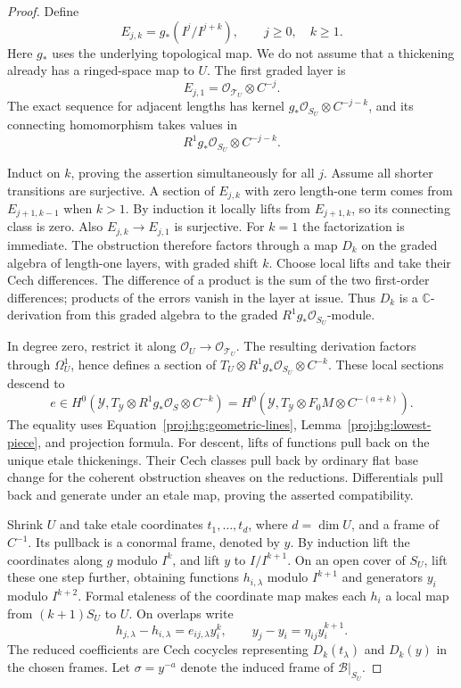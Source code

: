 \documentclass[11pt,letterpaper]{article}
\newcommand{\C}{\mathbb{C}}
\newcommand{\OO}{\mathcal{O}}
\theoremstyle{definition}
\theoremstyle{remark}
\begin{document}
\begin{proof}
Define
\[
 E_{j,k}=g_*(I^j/I^{j+k}),\qquad j\geq0,\quad k\geq1.
\]
Here \(g_*\) uses the underlying topological map.  We do not
assume that a thickening already has a ringed-space map to \(U\).
The first graded layer is
\[
 E_{j,1}=\OO_{\mathcal T_U}\otimes C^{-j}.
\]
The exact sequence for adjacent lengths has kernel
\(g_*\OO_{S_U}\otimes C^{-j-k}\), and its connecting homomorphism
takes values in
\[
 R^1g_*\OO_{S_U}\otimes C^{-j-k}.
\]

Induct on \(k\), proving the assertion simultaneously for all \(j\).
Assume all shorter transitions are surjective.  A section of
\(E_{j,k}\) with zero length-one term comes from \(E_{j+1,k-1}\)
when \(k>1\).  By induction it locally lifts from \(E_{j+1,k}\),
so its connecting class is zero.  Also \(E_{j,k}\to E_{j,1}\)
is surjective.  For \(k=1\) the factorization is immediate.
The obstruction therefore factors through a map \(D_k\) on the
graded algebra of length-one layers, with graded shift \(k\).
Choose local lifts and take their Cech differences.  The
difference of a product is the sum of the two first-order
differences; products of the errors vanish in the layer at issue.
Thus \(D_k\) is a \(\C\)-derivation from this graded algebra to
the graded \(R^1g_*\OO_{S_U}\)-module.

In degree zero, restrict it along
\(\OO_U\to\OO_{\mathcal T_U}\).  The resulting derivation factors
through \(\Omega_U^1\), hence defines a section of
\(T_U\otimes R^1g_*\OO_{S_U}\otimes C^{-k}\).
These local sections descend to
\begin{equation}\label{proj:hg:obstruction-section}
 e\in H^0\!\left(
 \mathcal Y,T_{\mathcal Y}\otimes R^1g_*\OO_S\otimes C^{-k}
 \right)
 =
 H^0\!\left(
 \mathcal Y,T_{\mathcal Y}\otimes F_0M\otimes C^{-(a+k)}
 \right).
\end{equation}
The equality uses Equation~\eqref{proj:hg:geometric-lines},
Lemma~\ref{proj:hg:lowest-piece}, and projection formula.
For descent, lifts of functions pull back on the unique etale
thickenings.  Their Cech classes pull back by ordinary flat base
change for the coherent obstruction sheaves on the reductions.
Differentials pull back and generate under an etale map, proving
the asserted compatibility.

Shrink \(U\) and take etale coordinates \(t_1,\ldots,t_d\),
where \(d=\dim U\), and a frame of \(C^{-1}\).  Its pullback is
a conormal frame, denoted by \(y\).  By induction lift the
coordinates along \(g\) modulo \(I^k\), and lift \(y\) to
\(I/I^{k+1}\).  On an open cover of \(S_U\), lift these one step
further, obtaining functions \(h_{i,\lambda}\) modulo \(I^{k+1}\)
and generators \(y_i\) modulo \(I^{k+2}\).  Formal etaleness of
the coordinate map makes each \(h_i\) a local map from
\((k+1)S_U\) to \(U\).  On overlaps write
\begin{equation}\label{proj:hg:coordinate-errors}
 h_{j,\lambda}-h_{i,\lambda}
       =e_{ij,\lambda}y_i^k,
 \qquad
 y_j-y_i=\eta_{ij}y_i^{k+1}.
\end{equation}
The reduced coefficients are Cech cocycles representing
\(D_k(t_\lambda)\) and \(D_k(y)\) in the chosen frames.
Let \(\sigma=y^{-a}\) denote the induced frame of
\(\mathcal B|_{S_U}\).


\end{proof}
\end{document}

